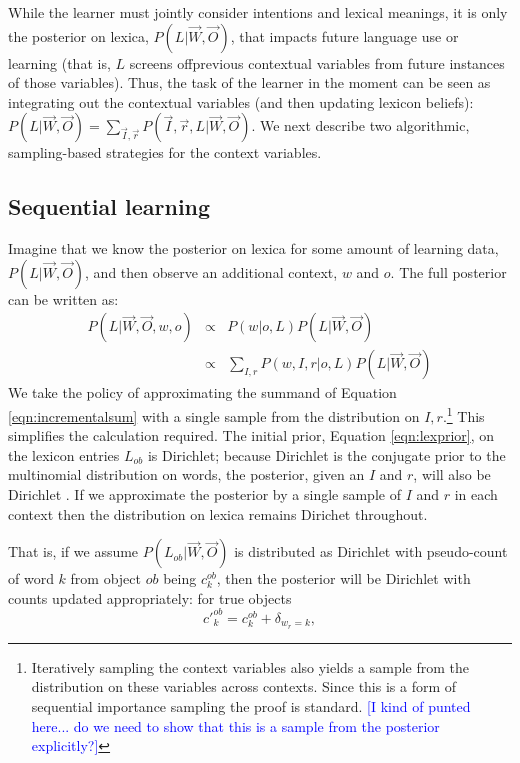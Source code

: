 \documentclass[man,noapacite,12pt]{apa2}
\newcommand{\nnote}[1]{\textcolor{blue}{[#1]}}
\begin{document}
While the learner must jointly consider intentions and lexical meanings, it is only the posterior on lexica, $P(L|\vec{W},\vec{O})$, that impacts future language use or learning (that is, $L$ screens offprevious contextual variables from future instances of those variables). Thus, the task of the learner in the moment can be seen as integrating out the contextual variables (and then updating lexicon beliefs): $P(L|\vec{W},\vec{O}) = \sum_{\vec{I}, \vec{r}} P( \vec{I}, \vec{r}, L | \vec{W}, \vec{O})$. We next describe two algorithmic, sampling-based strategies for the context variables.


\subsection{Sequential learning}

Imagine that we know the posterior on lexica for some amount of learning data,  $P(L|\vec{W},\vec{O})$, and then observe an additional context, $w$ and $o$. The full posterior can be written as:
\begin{eqnarray}
P(L|\vec{W},\vec{O}, w, o) &\propto& P(w|o,L)P(L|\vec{W},\vec{O}) \\
\label{eqn:incrementalsum} &\propto&  \sum_{I,r} P(w,I,r|o,L) P(L|\vec{W},\vec{O})
\end{eqnarray}
We take the policy of approximating the summand of Equation \ref{eqn:incrementalsum} with a single sample from the distribution on $I,r$.\footnote{Iteratively sampling the context variables also yields a sample from the distribution on these variables across contexts. Since this is a form of sequential importance sampling the proof is standard. \nnote{I kind of punted here... do we need to show that this is a sample from the posterior explicitly?}} 
This simplifies the calculation required.
The initial prior, Equation \ref{eqn:lexprior}, on the lexicon entries $L_{ob}$ is Dirichlet; because Dirichlet is the conjugate prior to the multinomial distribution on words, the posterior, given an $I$ and $r$, will also be Dirichlet \cite{somethingOnConjugacy}. If we approximate the posterior by a single sample of $I$ and $r$ in each context then the distribution on lexica remains Dirichet throughout. 

 That is, if we assume $P(L_{ob}|\vec{W},\vec{O})$ is distributed as Dirichlet with pseudo-count of word $k$ from object $ob$ being $c^{ob}_{k}$, then the posterior will be Dirichlet with counts updated appropriately: for true objects
$$
c'^{ob}_{k} = c^{ob}_{k} + \delta_{w_{r}=k},
$$
\end{document}

